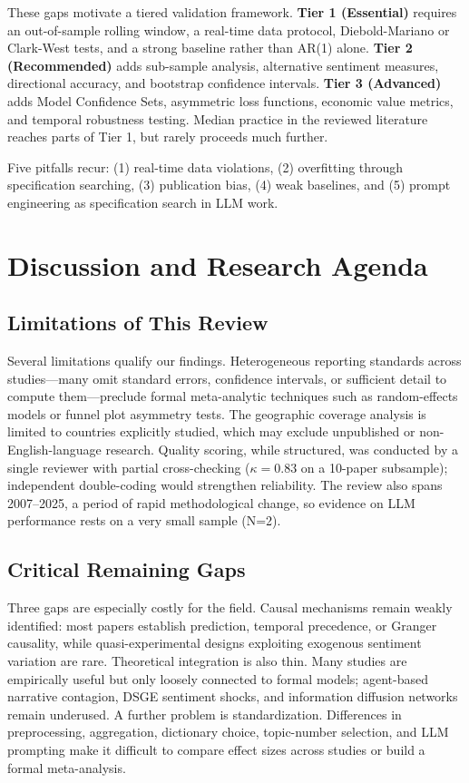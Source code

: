 \documentclass[12pt,oneside]{article}
\begin{document}
These gaps motivate a tiered validation framework. \textbf{Tier 1 (Essential)} requires an out-of-sample rolling window, a real-time data protocol, Diebold-Mariano or Clark-West tests, and a strong baseline rather than AR(1) alone. \textbf{Tier 2 (Recommended)} adds sub-sample analysis, alternative sentiment measures, directional accuracy, and bootstrap confidence intervals. \textbf{Tier 3 (Advanced)} adds Model Confidence Sets, asymmetric loss functions, economic value metrics, and temporal robustness testing. Median practice in the reviewed literature reaches parts of Tier 1, but rarely proceeds much further.

Five pitfalls recur: (1) real-time data violations, (2) overfitting through specification searching, (3) publication bias, (4) weak baselines, and (5) prompt engineering as specification search in LLM work.

\section{Discussion and Research Agenda}

\subsection{Limitations of This Review}

Several limitations qualify our findings. Heterogeneous reporting standards across studies---many omit standard errors, confidence intervals, or sufficient detail to compute them---preclude formal meta-analytic techniques such as random-effects models or funnel plot asymmetry tests. The geographic coverage analysis is limited to countries explicitly studied, which may exclude unpublished or non-English-language research. Quality scoring, while structured, was conducted by a single reviewer with partial cross-checking ($\kappa = 0.83$ on a 10-paper subsample); independent double-coding would strengthen reliability. The review also spans 2007--2025, a period of rapid methodological change, so evidence on LLM performance rests on a very small sample (N=2).

\subsection{Critical Remaining Gaps}

Three gaps are especially costly for the field. Causal mechanisms remain weakly identified: most papers establish prediction, temporal precedence, or Granger causality, while quasi-experimental designs exploiting exogenous sentiment variation are rare. Theoretical integration is also thin. Many studies are empirically useful but only loosely connected to formal models; agent-based narrative contagion, DSGE sentiment shocks, and information diffusion networks remain underused. A further problem is standardization. Differences in preprocessing, aggregation, dictionary choice, topic-number selection, and LLM prompting make it difficult to compare effect sizes across studies or build a formal meta-analysis.
\end{document}
